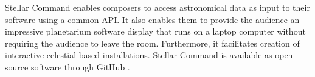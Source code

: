 Stellar Command enables composers to access astronomical data as input to their software using a common API.  It also enables them to provide the audience an impressive planetarium software display that runs on a laptop computer without requiring the audience to leave the room. Furthermore, it facilitates creation of interactive celestial based installations. Stellar Command is available as open source software through GitHub \cite{fraiettaSTELLARCOMMAND}.
